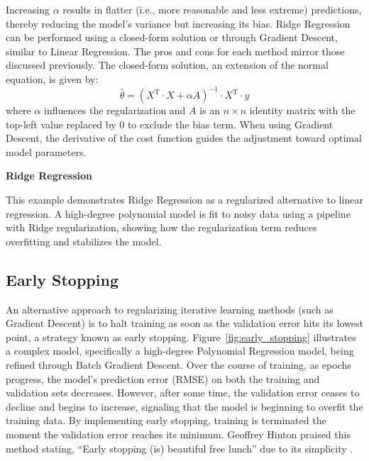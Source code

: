 \documentclass[12pt,letter]{article}
\begin{document}
Increasing $\alpha$ results in flatter (i.e., more reasonable and less extreme) predictions, thereby reducing the model's variance but increasing its bias. Ridge Regression can be performed using a closed-form solution or through Gradient Descent, similar to Linear Regression. The pros and cons for each method mirror those discussed previously. The closed-form solution, an extension of the normal equation, is given by:
\begin{equation}
\hat{\theta} = (X^\text{T} \cdot X + \alpha A)^{-1} \cdot X^\text{T} \cdot y
\end{equation}
where $\alpha$ influences the regularization and $A$ is an $n \times n$ identity matrix with the top-left value replaced by 0 to exclude the bias term. When using Gradient Descent, the derivative of the cost function guides the adjustment toward optimal model parameters.

\begin{example}
\textbf{Ridge Regression}

\noindent This example demonstrates Ridge Regression as a regularized alternative to linear regression. A high-degree polynomial model is fit to noisy data using a pipeline with Ridge regularization, showing how the regularization term reduces overfitting and stabilizes the model.
\end{example}


%
%
%
%
%

\subsection{Early Stopping}

An alternative approach to regularizing iterative learning methods 
(such as Gradient Descent) is to halt training as soon as the validation error hits its lowest point, a strategy known as early stopping. Figure~\ref{fig:early_stopping} illustrates a complex model, specifically a high-degree Polynomial Regression model, being refined through Batch Gradient Descent. Over the course of training, as epochs progress, the model's prediction error (RMSE) on both the training and validation sets decreases. However, after some time, the validation error ceases to decline and begins to increase, signaling that the model is beginning to overfit the training data. By implementing early stopping, training is terminated the moment the validation error reaches its minimum. Geoffrey Hinton praised this method stating, ``Early stopping (is) beautiful free lunch'' due to its simplicity \protect\footnotemark[1].
\end{document}
